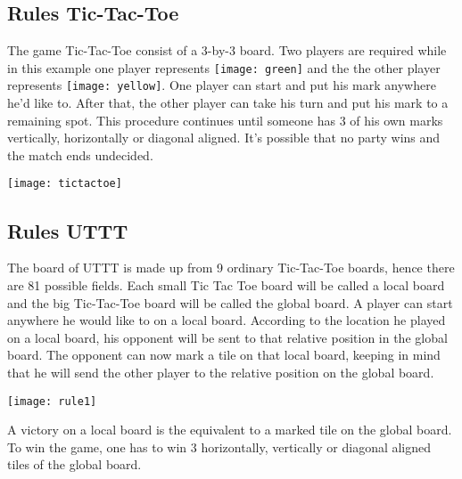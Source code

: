 \subsection{Rules Tic-Tac-Toe}

The game Tic-Tac-Toe consist of a 3-by-3 board. Two players are required while in this example one player represents \texttt{[image: green]} and the the other player represents \texttt{[image: yellow]}. One player can start and put his mark anywhere he'd like to. After that, the other player can take his turn and put his mark to a remaining spot. This procedure continues until someone has 3 of his own marks vertically, horizontally or diagonal aligned. It's possible that no party wins and the match ends undecided.\\

\begin{fixedpic}
	\centering
	\texttt{[image: tictactoe]}
\end{fixedpic}



\subsection{Rules \acl*{UTTT}} \label{rulesuttt}
The board of \ac{UTTT} is made up from 9 ordinary Tic-Tac-Toe boards, hence there are 81 possible fields.
Each small Tic Tac Toe board will be called a local board and the big Tic-Tac-Toe board will be called the global board.
A player can start anywhere he would like to on a local board. According to the location he played on a local board, his opponent will be sent to that relative position in the global board. The opponent can now mark a tile on that local board, keeping in mind that he will send the other player to the relative position on the global board. \\

\begin{fixedpic}
	\centering
	\texttt{[image: rule1]}
\end{fixedpic}

A victory on a local board is the equivalent to a marked tile on the global board. To win the game, one has to win 3 horizontally, vertically or diagonal aligned tiles of the global board.

